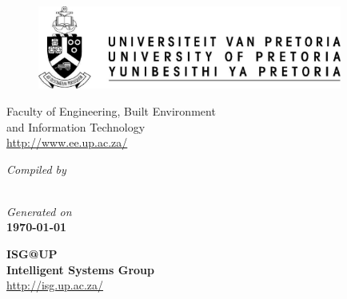 
\thispagestyle{empty}
{
  \renewcommand{\baselinestretch}{1.2}
  \newcommand{\HRule}{\rule{\linewidth}{0.4mm}}
  \setlength{\parindent}{0mm}
  \setlength{\parskip}{0mm}
  \pagfamily{}
  \centering

  \begin{figure}[!ht]
    \centering\includegraphics[width=10cm]{up-logo.eps}
  \end{figure}

  \medskip
  {\sc\Large\bchfamily Faculty of Engineering, Built Environment \\
    and Information Technology} \\
  \medskip
  \medskip
  {\sc\large\sffamily \eece}
  \url{http://www.ee.up.ac.za/}


  {\Large\bfseries\MakeUppercase{\doctype}}


  {\slshape Compiled by} \\
  \medskip
  \medskip
  {\large\bfseries\docauthor} \\
  {\large\docstudentnumber}

  {\slshape Generated on}\\
  \medskip
  \medskip
  {\bfseries \today}


  {\Huge\lmssfamily\bfseries ISG@UP} \\
  {\bfseries \sc \Large Intelligent Systems Group} \\
  \url{http://isg.up.ac.za/} \\
}

